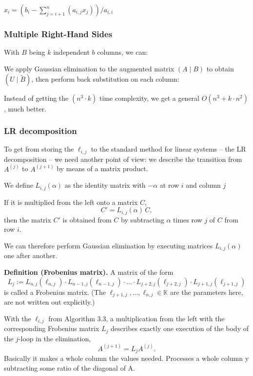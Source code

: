 \documentclass{article}
\begin{document}
\begin{algorithm}[H]
\caption{Translation (back substitution)}
\begin{algorithmic}[1]
  \State $x_i = (b_i - \sum_{j=i+1}^{n}(a_{i,j}x_j)) / a_{i,i}$
\EndFor
\end{algorithmic}
\end{algorithm}
\subsubsection{Multiple Right-Hand Sides}
With $B$ being $k$ independent $b$ columns, we can:

We apply Gaussian elimination to the augmented matrix $(A \mid B)$ to obtain $(U \mid \tilde{B})$, then perform back substitution on each column:

Instead of getting the $(n^3\cdot k)$ time complexity, we get a general $O(n^3 + k\cdot n^2)$, much better.
\subsubsection{LR decomposition}
To get from storing the $\ell_{i,j}$ to the standard method for linear systems -- the LR decomposition --
we need another point of view: we describe the transition from $A^{(j)}$ to $A^{(j+1)}$ by means of a matrix product.


We define $L_{i,j}(\alpha)$ as the identity matrix with $-\alpha$ at row $i$ and column $j$


If it is multiplied from the left onto a matrix $C$,
\begin{equation}
  C' = L_{i,j}(\alpha)\,C,
\end{equation}
then the matrix $C'$ is obtained from $C$ by subtracting $\alpha$ times row $j$ of $C$ from row $i$.

We can therefore perform Gaussian elimination by executing matrices $L_{i,j}(\alpha)$ one after another.

\textbf{Definition (Frobenius matrix).}
A matrix of the form
\begin{equation}
  L_j := L_{n,j}(\ell_{n,j}) \cdot L_{n-1,j}(\ell_{n-1,j}) \cdot \dots \cdot L_{j+2,j}(\ell_{j+2,j}) \cdot L_{j+1,j}(\ell_{j+1,j})
\end{equation}
is called a Frobenius matrix. (The $\ell_{j+1,j}, \dots, \ell_{n,j} \in \mathbb{K}$ are the parameters here, are not written out explicitly.)

With the $\ell_{i,j}$ from Algorithm 3.3, a multiplication from the left with the corresponding Frobenius matrix $L_j$ describes exactly one execution of the body of the $j$-loop in the elimination,
\begin{equation}
  A^{(j+1)} = L_j A^{(j)}.
\end{equation}
Basically it makes a whole column the values needed. Processes a whole column y subtracting some ratio of the diagonal of A.
\end{document}

